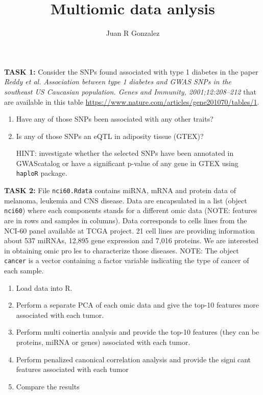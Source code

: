 \documentclass[11pt]{article}
\begin{document}
\title{\bf Multiomic data anlysis}
\date{}
\author{Juan R Gonzalez}

\maketitle



\noindent \textbf{TASK 1:} Consider the SNPs found associated with type 1 diabetes in the paper \textit{Reddy et al. Association between type 1 diabetes and GWAS SNPs in the southeast US Caucasian population. Genes and Immunity, 2001;12:208--212} that are available in this table \url{https://www.nature.com/articles/gene201070/tables/1}.

\begin{enumerate}
\item Have any of those SNPs been associated with any other traits? 

\item Is any of those SNPs an eQTL in adiposity tissue (GTEX)?

HINT: investigate whether the selected SNPs have been annotated in GWAScatalog or have a significant p-value of any gene in GTEX using {\tt haploR} package.

\end{enumerate}

\noindent \textbf{TASK 2:} File {\tt nci60.Rdata} contains miRNA, mRNA and protein data of melanoma, leukemia and CNS disease. Data are encapsulated in a list (object {\tt nci60}) where each components stands for a different omic data (NOTE: features are in rows and samples in columns). Data corresponds to cells lines from the NCI-60 panel available at TCGA project. 21 cell lines are providing information about 537 miRNAs, 12,895 gene expression and 7,016 proteins. We are interested in obtaining omic proles to characterize those diseases. NOTE: The object {\tt cancer} is a vector containing a factor variable indicating the type of cancer of each sample.

\begin{enumerate}
\item Load data into R.
\item Perform a separate PCA of each omic data and give the top-10 features more associated with each tumor.
\item Perform multi coinertia analysis and provide the top-10 features (they can be proteins, miRNA or genes) associated with each tumor.
\item Perform penalized canonical correlation analysis and provide the signicant features associated with each tumor
\item Compare the results
\end{enumerate}
\end{document}
